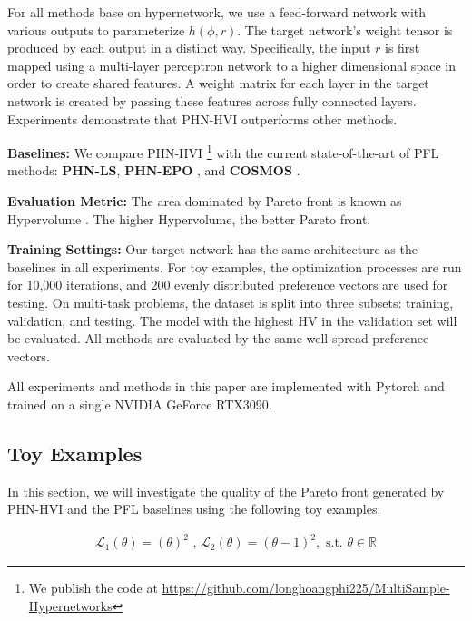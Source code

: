 \documentclass[letterpaper]{article} %
\newcommand{\ourmodel}{PHN-HVI }
\begin{document}
For all methods base on hypernetwork, we use a feed-forward network with various outputs to parameterize $h(\phi, r)$. The target network's weight tensor is produced by each output in a distinct way. Specifically, the input $r$ is first mapped using a multi-layer perceptron network to a higher dimensional space in order to create shared features. A weight matrix for each layer in the target network is created by passing these features across fully connected layers. Experiments demonstrate that \ourmodel outperforms other methods.

\textbf{Baselines:} We compare \ourmodel\footnote{We publish the code at \url{https://github.com/longhoangphi225/MultiSample-Hypernetworks}} with the current state-of-the-art of PFL methods: \textbf{PHN-LS}, \textbf{PHN-EPO} \cite{navon2021learning}, and \textbf{COSMOS} \cite{ruchte2021scalable}.

\textbf{Evaluation Metric:} The area dominated by Pareto front is known as Hypervolume \cite{zitzler1999multiobjective}. The higher Hypervolume, the better Pareto front.

\textbf{Training Settings:} Our target network has the same architecture as the baselines in all experiments. For toy examples, the optimization processes are run for 10,000 iterations, and 200 evenly distributed preference vectors are used for testing. On multi-task problems, the dataset is split into three subsets: training, validation, and testing. The model with the highest HV in the validation set will be evaluated. All methods are evaluated by the same well-spread preference vectors.

All experiments and methods in this paper are implemented with Pytorch \cite{pytorch} and trained on a single NVIDIA GeForce RTX3090.
\subsection{Toy Examples}
\label{sst:toy}
In this section, we will investigate the quality of the Pareto front generated by \ourmodel and the PFL baselines using the following toy examples:


\begin{equation}
\begin{aligned}
\mathcal{L}_1(\theta) = (\theta)^2 \text{ , } \mathcal{L}_2(\theta) = (\theta-1)^2, \text{ s.t. }\theta \in \mathbb{R}
\end{aligned}
\end{equation}
\end{document}
